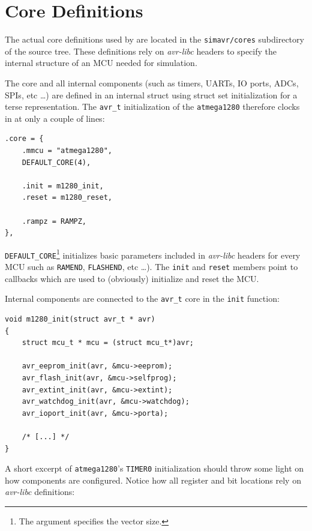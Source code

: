 \section{Core Definitions}

The actual core definitions used by \simavr are located in the
\verb|simavr/cores| subdirectory of the source tree. These definitions rely on
\emph{avr-libc} headers to specify the internal structure of an \ac{MCU} needed
for simulation.

The core and all internal components (such as timers, \acp{UART}, \ac{IO} ports,
\acp{ADC}, \acp{SPI}, etc \ldots) are defined in an internal struct using struct
set initialization for a terse representation. The \lstinline|avr_t| initialization
of the \verb|atmega1280| therefore clocks in at only a couple of lines:

\begin{lstlisting}
.core = {
    .mmcu = "atmega1280",
    DEFAULT_CORE(4),

    .init = m1280_init,
    .reset = m1280_reset,

    .rampz = RAMPZ,
},
\end{lstlisting}

\lstinline|DEFAULT_CORE|\footnote{
%
The argument specifies the vector size.
%
} initializes basic parameters included in \emph{avr-libc}
headers for every \ac{MCU} such as \lstinline|RAMEND|, \lstinline|FLASHEND|,
etc \ldots). The \lstinline|init| and \lstinline|reset| members point to callbacks
which are used to (obviously) initialize and reset the \ac{MCU}.

Internal components are connected to the \lstinline|avr_t| core in the
\lstinline|init| function:

\begin{lstlisting}
void m1280_init(struct avr_t * avr)
{
    struct mcu_t * mcu = (struct mcu_t*)avr;

    avr_eeprom_init(avr, &mcu->eeprom);
    avr_flash_init(avr, &mcu->selfprog);
    avr_extint_init(avr, &mcu->extint);
    avr_watchdog_init(avr, &mcu->watchdog);
    avr_ioport_init(avr, &mcu->porta);

    /* [...] */
}
\end{lstlisting}

A short excerpt of \verb|atmega1280|'s \lstinline|TIMER0| initialization should
throw some light on how components are configured. Notice how all register and
bit locations rely on \emph{avr-libc} definitions:

